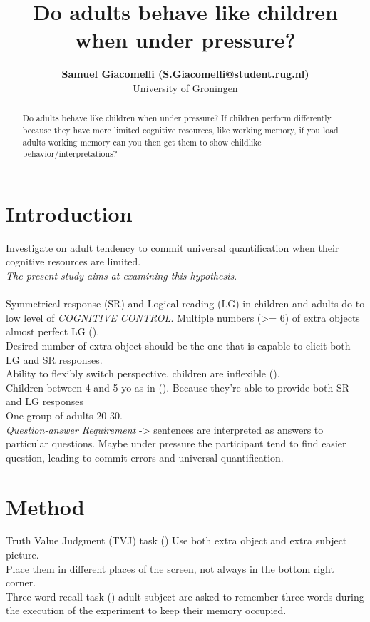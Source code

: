 \documentclass[10pt, a4]{article}
\title{Do adults behave like children when under pressure?}
\author{{\large \bf Samuel Giacomelli (S.Giacomelli@student.rug.nl)} \\
University of Groningen}
\begin{document}
\maketitle

\begin{abstract}
    Do adults behave like children when under pressure? If children perform
    differently because they have more limited cognitive resources, like working
    memory, if you load adults working memory can you then get them to show childlike
    behavior/interpretations?   
\end{abstract}

\section{Introduction}
Investigate on adult tendency to commit universal quantification when their cognitive resources are limited.\\
\textit{The present study aims at examining this hypothesis}.\\
\\
Symmetrical response (SR) and Logical reading (LG) in children and adults do to low level of \textit{COGNITIVE CONTROL}.
Multiple numbers (>= 6) of extra objects almost perfect LG (\cite{sugisaki2001quantification}).\\
Desired number of extra object should be the one that is capable to elicit both LG and SR responses.\\
Ability to flexibly switch perspective, children are inflexible (\cite{piaget1954language}).\\
Children between 4 and 5 yo as in (\cite{minai2012hinders}). Because they're able to provide both SR and LG responses\\
One group of adults 20-30.\\
\textit{Question-answer Requirement} -> sentences are interpreted as answers to particular questions. Maybe
under pressure the participant tend to find easier question, leading to commit errors and universal quantification.\\



\section{Method}
Truth Value Judgment (TVJ) task (\cite{crain2000investigations})
Use both extra object and extra subject picture.\\
Place them in different places of the screen, not always in the bottom right corner.\\
Three word recall task (\cite{cullum1993three}) adult subject are asked to remember three words during the
execution of the experiment to keep their memory occupied.
\end{document}
